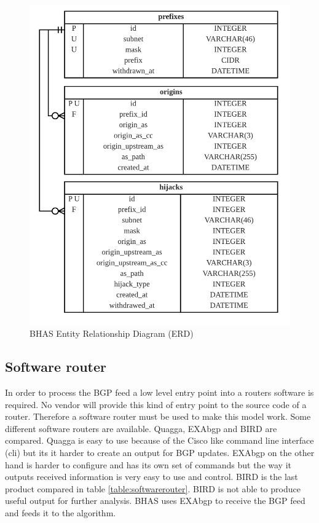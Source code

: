 \begin{figure}[hb!]
\begin{minipage}{.5\textwidth}
    \includegraphics[scale=0.14]{images/erd.png}
    \caption{BHAS Entity Relationship Diagram (ERD)}
    \label{fig:erddatabase}
\end{minipage}
\end{figure}

\subsection{Software router}\label{subsec:softwarerouter}
In order to process the BGP feed a low level entry point into a routers software is required. No vendor will provide this kind of entry point to the source code of a router. Therefore a software router must be used to make this model work. Some different software routers are available. Quagga\cite{quagga}, EXAbgp\cite{exabgp} and BIRD \cite{bird} are compared. Quagga is easy to use because of the Cisco like command line interface (cli) but its it harder to create an output for BGP updates. EXAbgp on the other hand is harder to configure and has its own set of commands but the way it outputs received information is very easy to use and control. BIRD is the last product compared in table \ref{table:softwarerouter}. BIRD is not able to produce useful output for further analysis. BHAS uses EXAbgp to receive the BGP feed and feeds it to the algorithm. 

